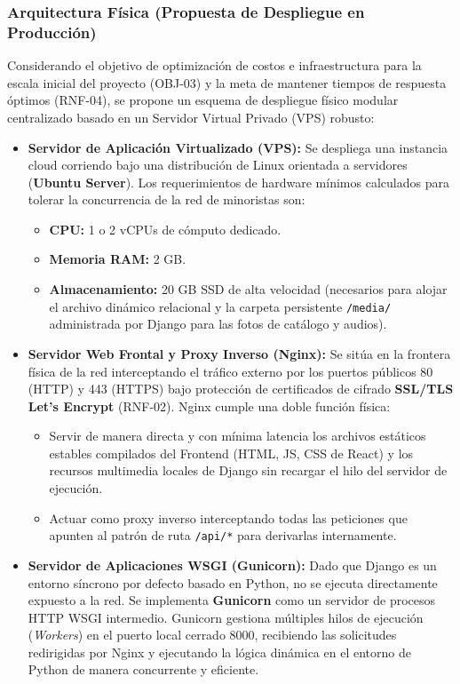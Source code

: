 \documentclass[12pt, a4paper]{article}
\begin{document}
\subsubsection{Arquitectura Física (Propuesta de Despliegue en Producción)}

Considerando el objetivo de optimización de costos e infraestructura para la escala inicial del proyecto (OBJ-03) y la meta de mantener tiempos de respuesta óptimos (RNF-04), se propone un esquema de despliegue físico modular centralizado basado en un Servidor Virtual Privado (VPS) robusto:

\begin{itemize}
  \item \textbf{Servidor de Aplicación Virtualizado (VPS):} Se despliega una instancia cloud corriendo bajo una distribución de Linux orientada a servidores (\textbf{Ubuntu Server}). Los requerimientos de hardware mínimos calculados para tolerar la concurrencia de la red de minoristas son:
  \begin{itemize}
    \item \textbf{CPU:} 1 o 2 vCPUs de cómputo dedicado.
    \item \textbf{Memoria RAM:} 2 GB.
    \item \textbf{Almacenamiento:} 20 GB SSD de alta velocidad (necesarios para alojar el archivo dinámico relacional y la carpeta persistente \texttt{/media/} administrada por Django para las fotos de catálogo y audios).
  \end{itemize}

  \item \textbf{Servidor Web Frontal y Proxy Inverso (Nginx):} Se sitúa en la frontera física de la red interceptando el tráfico externo por los puertos públicos 80 (HTTP) y 443 (HTTPS) bajo protección de certificados de cifrado \textbf{SSL/TLS Let's Encrypt} (RNF-02). Nginx cumple una doble función física:
  \begin{itemize}
    \item Servir de manera directa y con mínima latencia los archivos estáticos estables compilados del Frontend (HTML, JS, CSS de React) y los recursos multimedia locales de Django sin recargar el hilo del servidor de ejecución.
    \item Actuar como proxy inverso interceptando todas las peticiones que apunten al patrón de ruta \texttt{/api/*} para derivarlas internamente.
  \end{itemize}

  \item \textbf{Servidor de Aplicaciones WSGI (Gunicorn):} Dado que Django es un entorno síncrono por defecto basado en Python, no se ejecuta directamente expuesto a la red. Se implementa \textbf{Gunicorn} como un servidor de procesos HTTP WSGI intermedio. Gunicorn gestiona múltiples hilos de ejecución (\textit{Workers}) en el puerto local cerrado 8000, recibiendo las solicitudes redirigidas por Nginx y ejecutando la lógica dinámica en el entorno de Python de manera concurrente y eficiente.


\end{itemize}
\end{document}

